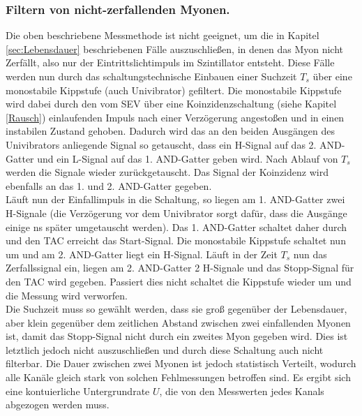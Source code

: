   \subsubsection{Filtern von nicht-zerfallenden Myonen.}
  Die oben beschriebene Messmethode ist nicht geeignet, um die in Kapitel \ref{sec:Lebensdauer}
  beschriebenen Fälle auszuschließen, in denen das Myon nicht Zerfällt, also nur
  der Eintrittslichtimpuls im Szintillator entsteht. Diese Fälle werden nun
  durch das schaltungstechnische Einbauen einer Suchzeit $T_s$ über eine monostabile
  Kippstufe (auch Univibrator) gefiltert. Die monostabile Kippstufe wird dabei durch
  den vom SEV über eine Koinzidenzschaltung (siehe Kapitel \ref{Rausch}) einlaufenden
  Impuls nach einer Verzögerung angestoßen und in einen instabilen Zustand gehoben.
  Dadurch wird das an den beiden Ausgängen des Univibrators anliegende Signal so
  getauscht, dass ein H-Signal auf das 2. AND-Gatter und ein L-Signal auf das 1. AND-Gatter
  geben wird. Nach Ablauf von $T_s$ werden die Signale wieder zurückgetauscht.
  Das Signal der Koinzidenz wird ebenfalls an das 1. und 2. AND-Gatter gegeben.\\
  Läuft nun der Einfallimpuls in die Schaltung, so liegen am 1. AND-Gatter zwei
  H-Signale (die Verzögerung vor dem Univibrator sorgt dafür, dass die Ausgänge einige
  \si{\nano\second} später umgetauscht werden). Das 1. AND-Gatter schaltet daher durch
  und den TAC erreicht das Start-Signal. Die monostabile Kippstufe schaltet nun um
  und am 2. AND-Gatter liegt ein H-Signal. Läuft in der Zeit $T_s$ nun das Zerfallssignal
  ein, liegen am 2. AND-Gatter 2 H-Signale und das Stopp-Signal für den TAC wird gegeben.
  Passiert dies nicht schaltet die Kippstufe wieder um und die Messung wird verworfen.\\
  Die Suchzeit muss so gewählt werden, dass sie groß gegenüber der Lebensdauer, aber klein
  gegenüber dem zeitlichen Abstand zwischen zwei einfallenden Myonen ist, damit das
  Stopp-Signal nicht durch ein zweites Myon gegeben wird. Dies ist letztlich jedoch nicht
  auszuschließen und durch diese Schaltung auch nicht filterbar. Die Dauer zwischen
  zwei Myonen ist jedoch statistisch Verteilt, wodurch alle Kanäle gleich stark von
  solchen Fehlmessungen betroffen sind. Es ergibt sich eine kontuierliche Untergrundrate $U$,
  die von den Messwerten jedes Kanals abgezogen werden muss.
